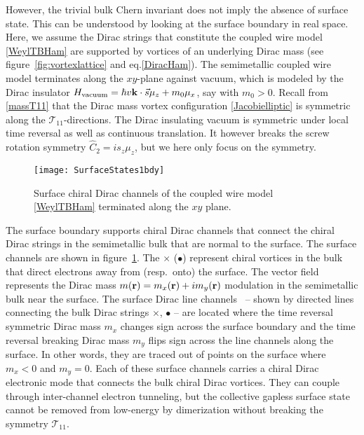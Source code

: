 However, the trivial bulk Chern invariant does not imply the absence of surface state. This can be understood by looking at the surface boundary in real space. Here, we assume the Dirac strings that constitute the coupled wire model \eqref{WeylTBHam} are supported by vortices of an underlying Dirac mass (see figure~\ref{fig:vortexlattice} and eq.\eqref{DiracHam}). The semimetallic coupled wire model terminates along the $xy$-plane against vacuum, which is modeled by the Dirac insulator $H_{\mathrm{vacuum}}=\hbar v{\bf k}\cdot\vec{s}\mu_z+m_0\mu_x$, say with $m_0>0$. Recall from \eqref{massT11} that the Dirac mass vortex configuration \eqref{Jacobielliptic} is \AFTR symmetric along the $\mathcal{T}_{11}$-directions. The Dirac insulating vacuum is symmetric under local time reversal as well as continuous translation. It however breaks the screw rotation symmetry $\hat{C}_2=is_z\mu_z$, but we here only focus on the \AFTR symmetry.

\begin{figure}[htbp]
\centering\texttt{[image: SurfaceStates1bdy]}
\caption{Surface chiral Dirac channels of the coupled wire model \eqref{WeylTBHam} terminated along the $xy$ plane.}\label{fig:SurfaceStates1bdy}
\end{figure}

The surface boundary supports chiral Dirac channels that connect the chiral Dirac strings in the semimetallic bulk that are normal to the surface. The surface channels are shown in figure~\ref{fig:SurfaceStates1bdy}. The {\color{blue}$\times$} ({\color{red}$\bullet$}) represent chiral vortices in the bulk that direct electrons away from (resp.~onto) the surface. The vector field represents the Dirac mass $m({\bf r})=m_x({\bf r})+im_y({\bf r})$ modulation in the semimetallic bulk near the surface. The surface Dirac line channels~\cite{TeoKane} -- shown by directed lines connecting the bulk Dirac strings {\color{blue}$\times$}, {\color{red}$\bullet$} -- are located where the time reversal symmetric Dirac mass $m_x$ changes sign across the surface boundary and the time reversal breaking Dirac mass $m_y$ flips sign across the line channels along the surface. In other words, they are traced out of points on the surface where $m_x<0$ and $m_y=0$. Each of these surface channels carries a chiral Dirac electronic mode that connects the bulk chiral Dirac vortices. They can couple through inter-channel electron tunneling, but the collective gapless surface state cannot be removed from low-energy by dimerization without breaking the \AFTR symmetry $\mathcal{T}_{11}$. %